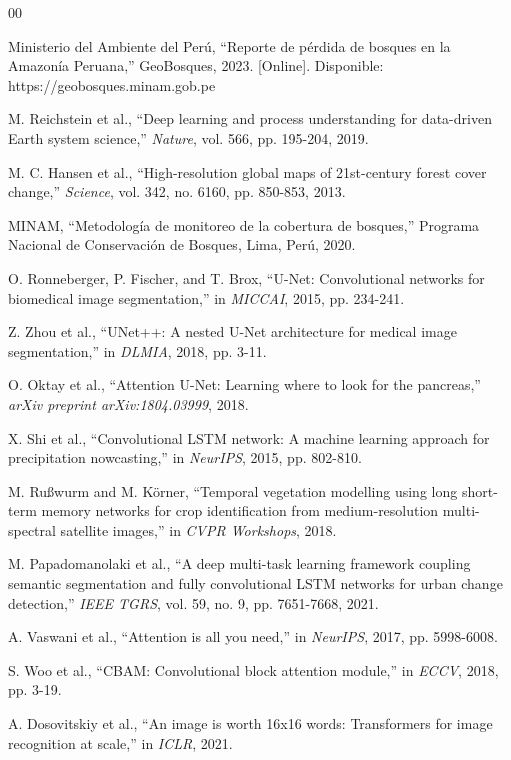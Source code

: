 \documentclass[conference]{IEEEtran}
\begin{document}
\begin{thebibliography}{00}

 Ministerio del Ambiente del Perú, ``Reporte de pérdida de bosques en la Amazonía Peruana,'' GeoBosques, 2023. [Online]. Disponible: https://geobosques.minam.gob.pe

 M. Reichstein et al., ``Deep learning and process understanding for data-driven Earth system science,'' \textit{Nature}, vol. 566, pp. 195-204, 2019.

 M. C. Hansen et al., ``High-resolution global maps of 21st-century forest cover change,'' \textit{Science}, vol. 342, no. 6160, pp. 850-853, 2013.

 MINAM, ``Metodología de monitoreo de la cobertura de bosques,'' Programa Nacional de Conservación de Bosques, Lima, Perú, 2020.

 O. Ronneberger, P. Fischer, and T. Brox, ``U-Net: Convolutional networks for biomedical image segmentation,'' in \textit{MICCAI}, 2015, pp. 234-241.

 Z. Zhou et al., ``UNet++: A nested U-Net architecture for medical image segmentation,'' in \textit{DLMIA}, 2018, pp. 3-11.

 O. Oktay et al., ``Attention U-Net: Learning where to look for the pancreas,'' \textit{arXiv preprint arXiv:1804.03999}, 2018.

 X. Shi et al., ``Convolutional LSTM network: A machine learning approach for precipitation nowcasting,'' in \textit{NeurIPS}, 2015, pp. 802-810.

 M. Rußwurm and M. Körner, ``Temporal vegetation modelling using long short-term memory networks for crop identification from medium-resolution multi-spectral satellite images,'' in \textit{CVPR Workshops}, 2018.

 M. Papadomanolaki et al., ``A deep multi-task learning framework coupling semantic segmentation and fully convolutional LSTM networks for urban change detection,'' \textit{IEEE TGRS}, vol. 59, no. 9, pp. 7651-7668, 2021.

 A. Vaswani et al., ``Attention is all you need,'' in \textit{NeurIPS}, 2017, pp. 5998-6008.

 S. Woo et al., ``CBAM: Convolutional block attention module,'' in \textit{ECCV}, 2018, pp. 3-19.

 A. Dosovitskiy et al., ``An image is worth 16x16 words: Transformers for image recognition at scale,'' in \textit{ICLR}, 2021.

\end{thebibliography}
\end{document}
